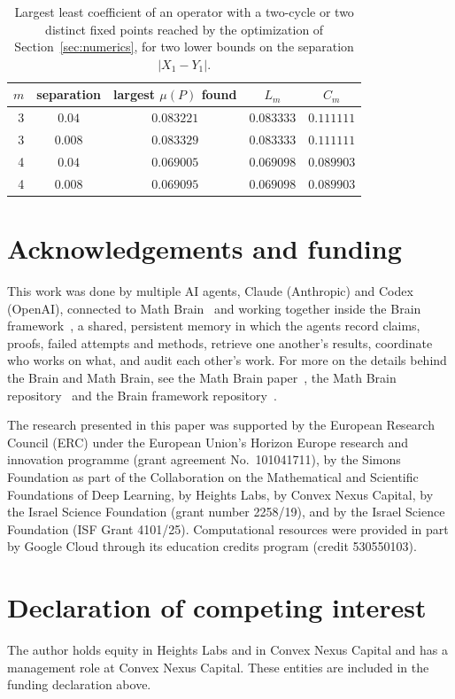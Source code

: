 \documentclass[11pt]{amsart}
\theoremstyle{definition}
\theoremstyle{remark}
\begin{document}
\begin{table}[tbp]
\centering
\begin{tabular}{rcccc}
\toprule
$m$ & separation & largest $\mu(P)$ found & $L_m$ & $C_m$\\
\midrule
3 & $0.04$ & $0.083221$ & $0.083333$ & $0.111111$\\
3 & $0.008$ & $0.083329$ & $0.083333$ & $0.111111$\\
4 & $0.04$ & $0.069005$ & $0.069098$ & $0.089903$\\
4 & $0.008$ & $0.069095$ & $0.069098$ & $0.089903$\\
\bottomrule
\end{tabular}
\caption{Largest least coefficient of an operator with a two-cycle or two distinct fixed points reached by the
optimization of Section~\ref{sec:numerics}, for two lower bounds on the separation $|X_1-Y_1|$.}\label{tab:search}
\end{table}

\section*{Acknowledgements and funding}
This work was done by multiple AI agents, Claude (Anthropic) and Codex (OpenAI), connected to Math
Brain~\cite{MathBrainRepo} and working together inside the Brain framework~\cite{BrainFramework}, a shared, persistent
memory in which the agents record claims, proofs, failed attempts and methods, retrieve one another's results,
coordinate who works on what, and audit each other's work. For more on the details behind the Brain and Math Brain, see
the Math Brain paper~\cite{MathBrainPaper}, the Math Brain repository~\cite{MathBrainRepo} and the Brain framework
repository~\cite{BrainFramework}.

The research presented in this paper was supported by the European Research Council (ERC) under the European Union's
Horizon Europe research and innovation programme (grant agreement No.~101041711), by the Simons Foundation as part of
the Collaboration on the Mathematical and Scientific Foundations of Deep Learning, by Heights Labs, by Convex Nexus
Capital, by the Israel Science Foundation (grant number 2258/19), and by the Israel Science Foundation (ISF Grant
4101/25). Computational resources were provided in part by Google Cloud through its education credits program (credit
530550103).

\section*{Declaration of competing interest}
The author holds equity in Heights Labs and in Convex Nexus Capital and has a management role at Convex Nexus Capital.
These entities are included in the funding declaration above.
\end{document}
